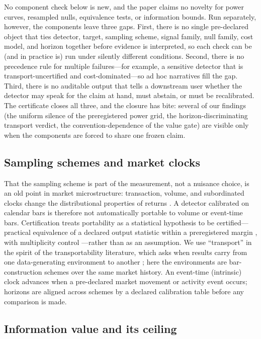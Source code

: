 \documentclass[3p]{elsarticle}
\begin{document}
No component check below is new, and the paper claims no novelty for power
curves, resampled nulls, equivalence tests, or information bounds. Run
separately, however, the components leave three gaps. First, there is no
single pre-declared object that ties detector, target, sampling scheme,
signal family, null family, cost model, and horizon together before evidence
is interpreted, so each check can be (and in practice is) run under silently
different conditions. Second, there is no precedence rule for multiple
failures---for example, a sensitive detector that is transport-uncertified
and cost-dominated---so ad hoc narratives fill the gap. Third, there is no
auditable output that tells a downstream user whether the detector may speak
for the claim at hand, must abstain, or must be recalibrated. The certificate
closes all three, and the closure has bite: several of our findings (the
uniform silence of the preregistered power grid, the horizon-discriminating
transport verdict, the convention-dependence of the value gate) are visible
only when the components are forced to share one frozen claim.

\subsection{Sampling schemes and market clocks}

That the sampling scheme is part of the measurement, not a nuisance choice,
is an old point in market microstructure: transaction, volume, and
subordinated clocks change the distributional properties of returns
\citep{MandelbrotTaylor1967,Clark1973,AneGeman2000,Guillaume1997,Dacorogna2001,Easley2012}.
A detector calibrated on calendar bars is therefore not automatically
portable to volume or event-time bars. Certification treats portability as a
statistical hypothesis to be certified---practical equivalence of a declared
output statistic within a preregistered margin \citep{Schuirmann1987}, with
multiplicity control \citep{Holm1979}---rather than as an assumption. We use
``transport'' in the spirit of the transportability literature, which asks
when results carry from one data-generating environment to another
\citep{PearlBareinboim2014}; here the environments are bar-construction
schemes over the same market history. An event-time (intrinsic) clock
advances when a pre-declared market movement or activity event occurs;
horizons are aligned across schemes by a declared calibration table before
any comparison is made.

\subsection{Information value and its ceiling}
\end{document}
